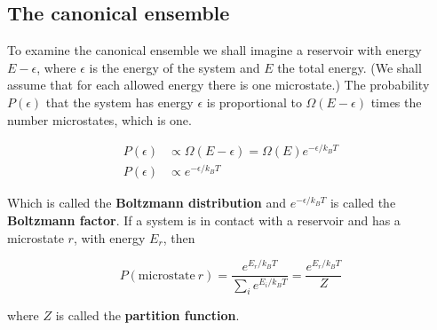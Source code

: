 \documentclass[a4paper]{article}
\begin{document}
\subsection{The canonical ensemble}

To examine the canonical ensemble we shall imagine a reservoir with energy $E-\epsilon$, where $\epsilon$ is the energy of the system and $E$ the total energy. (We shall assume that for each allowed energy there is one microstate.) The probability $P(\epsilon)$ that the system has energy $\epsilon$ is proportional to $\Omega(E-\epsilon)$ times the number microstates, which is one.


\begin{align}
	P(\epsilon)&\propto \Omega(E-\epsilon)=\Omega(E) e^{-\epsilon/k_BT}\\[1em]
    P(\epsilon)&\propto e^{-\epsilon/k_BT}
\end{align}

Which is called the \textbf{Boltzmann distribution} and $e^{-\epsilon/k_BT}$ is called the \textbf{Boltzmann factor}. If a system is in contact with a reservoir and has a microstate $r$, with energy $E_r$, then

\begin{equation}
	P(\text{microstate}\ r)=\frac{e^{E_r/k_BT}}{\sum_i e^{E_i/k_BT}}=\frac{e^{E_r/k_BT}}{Z}
\end{equation}

where $Z$ is called the \textbf{partition function}.
\end{document}
